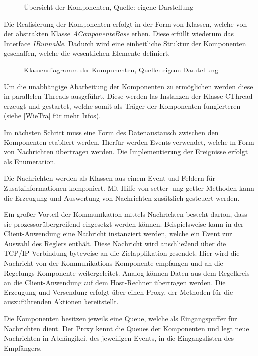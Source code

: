 \begin{figure}
\caption{Übersicht der Komponenten, Quelle: eigene Darstellung}
\end{figure}

Die Realisierung der Komponenten erfolgt in der Form von Klassen, welche von der abstrakten Klasse \textit{AComponenteBase} erben. Diese erfüllt wiederum das Interface \textit{IRunnable}. Dadurch wird eine einheitliche Struktur der Komponenten geschaffen, welche die wesentlichen Elemente definiert.

\begin{figure}
\caption{Klassendiagramm der Komponenten, Quelle: eigene Darstellung}
\end{figure}

Um die unabhängige Abarbeitung der Komponenten zu ermöglichen werden diese in parallelen Threads ausgeführt. Diese werden las Instanzen der Klasse CThread erzeugt und gestartet, welche somit als Träger der Komponenten fungierteren (siehe [WieTra] für mehr Infos).


Im nächsten Schritt muss eine Form des Datenaustausch zwischen den Komponenten etabliert werden. Hierfür werden Events verwendet, welche in Form von Nachrichten übertragen werden. Die Implementierung der Ereignisse erfolgt als Enumeration.


Die Nachrichten werden als Klassen aus einem Event und Feldern für Zusatzinformationen komponiert. Mit Hilfe von setter- ung getter-Methoden kann die Erzeugung und Auswertung von Nachrichten zusätzlich gesteuert werden.


Ein großer Vorteil der Kommunikation mittels Nachrichten besteht darion, dass sie prozessorübergreifend eingesetzt werden können. Beispielsweise kann in der Client-Anwendung eine Nachricht instanziert werden, welche ein Event zur Auswahl des Reglers enthält. Diese Nachricht wird anschließend über die TCP/IP-Verbindung byteweise an die Zielapplikation gesendet. Hier wird die Nachricht von der Kommunikations-Komponente empfangen und an die Regelungs-Komponente weitergeleitet. Analog können Daten aus dem Regelkreis an die Client-Anwendung auf dem Host-Rechner übertragen werden.
Die Erzeugung und Versendung erfolgt über einen Proxy, der Methoden für die auszuführenden Aktionen bereitstellt.


Die Komponenten besitzen jeweils eine Queue, welche als Eingangspuffer für Nachrichten dient. Der Proxy kennt die Queues der Komponenten und legt neue Nachrichten in Abhängikeit des jeweiligen Events, in die Eingangslisten des Empfängers.